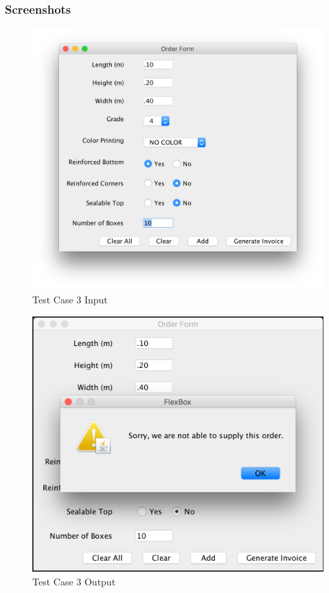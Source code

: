 \documentclass[12pt]{article}
\begin{document}
\subsubsection{Screenshots}
\begin{figure}[H]
	\includegraphics[width=\linewidth]{./screenshots/test_case_3_input.png}
	\caption{Test Case 3 Input}
	\label{test_case_3_input}
\end{figure}
\begin{figure}[H]
	\includegraphics[width=\linewidth]{./screenshots/test_case_3_output.png}
	\caption{Test Case 3 Output}
	\label{test_case_3_output}
\end{figure}
\newpage
\end{document}
